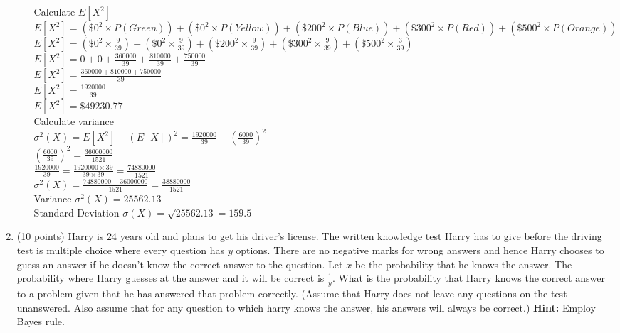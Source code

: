 \documentclass{article}%
\begin{document}
\begin{enumerate}
\begin{enumerate}
        Calculate $E[X^2]$\\
        $E[X^2] = (\$0^2 \times P(Green)) + (\$0^2 \times P(Yellow)) + (\$200^2 \times P(Blue)) + (\$300^2 \times P(Red)) + (\$500^2 \times P(Orange))$\\
        $E[X^2] = (\$0^2 \times \frac{9}{39}) + (\$0^2 \times \frac{9}{39}) + (\$200^2 \times \frac{9}{39}) + (\$300^2 \times \frac{9}{39}) + (\$500^2 \times \frac{3}{39})$\\
        $E[X^2] = 0 + 0 + \frac{360000}{39} + \frac{810000}{39} + \frac{750000}{39}$\\
        $E[X^2] = \frac{360000 + 810000 + 750000}{39}$\\
        $E[X^2] = \frac{1920000}{39}$\\
        $E[X^2] = \$49230.77$\\

        Calculate variance\\
        $\sigma^2(X) = E[X^2] - (E[X])^2 = \frac{1920000}{39} - (\frac{6000}{39})^2$\\
        $(\frac{6000}{39})^2 = \frac{36000000}{1521}$\\
        $\frac{1920000}{39} = \frac{1920000 \times 39}{39 \times 39} = \frac{74880000}{1521}$\\
        $\sigma^2(X) = \frac{74880000 - 36000000}{1521} = \frac{38880000}{1521}$\\
        Variance $\sigma^2(X) = 25562.13$\\
        Standard Deviation $\sigma(X) = \sqrt{25562.13} = 159.5$\\
    \end{enumerate}

    \item (10 points) Harry is 24 years old and plans to get his driver's license. The written knowledge test Harry has to give before the driving test is multiple choice where every question has \emph{y} options. There are no negative marks for wrong answers and hence Harry chooses to guess an answer if he doesn't know the correct answer to the question. Let $x$ be the probability that he knows the answer. The probability where Harry guesses at the answer and it will be correct is $\frac{1}{y}$. What is the probability that Harry knows the correct answer to a problem given that he has answered that problem correctly.
    (Assume that Harry does not leave any questions on the test unanswered. Also assume that for any question to which harry knows the answer, his answers will always be correct.) \textbf{Hint:} Employ Bayes rule.


\end{enumerate}
\end{document}
